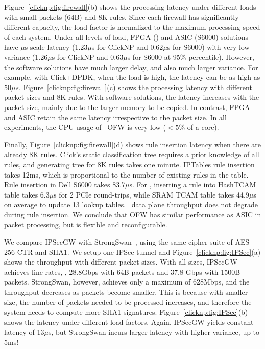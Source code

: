 Figure~\ref{clicknp:fig:firewall}(b) shows the processing latency under different loads with small packets (64B) and 8K rules. 
Since each firewall has significantly different capacity, the load factor is normalized to the maximum processing speed of each system. 
%
Under all levels of load, FPGA (\name) and ASIC (S6000) solutions have $\mu$s-scale latency (1.23$\mu$s for ClickNP and 0.62$\mu$s for S6000) with very low variance (1.26$\mu$s for ClickNP and 0.63$\mu$s for S6000 at 95\% percentile).
However, the software solutions have much larger delay, and also much larger variance. 
For example, with Click+DPDK, when the load is high, the latency can be as high as $50\mu s$.
%
Figure~\ref{clicknp:fig:firewall}(c) shows the processing latency with different packet sizes and 8K rules.
With software solutions, the latency increases with the packet size, mainly due to the larger 
memory to be copied.
In contrast, FPGA and ASIC retain the same latency irrespective to the packet size. 
In all experiments, the CPU usage of \name\ OFW is very low ($<5\%$ of a core).

Finally, Figure~\ref{clicknp:fig:firewall}(d) shows rule insertion latency when there are already 8K rules. Click's static classification tree requires a prior knowledge of all rules, and generating tree for 8K rules takes one minute.
IPTables rule insertion takes 12ms, which is proportional to the number of existing rules in the table.
Rule insertion in Dell S6000 takes 83.7$\mu$s.
For \name, inserting a rule into HashTCAM table takes 6.3$\mu$s for 2 PCIe round-trips, while SRAM TCAM table takes 44.9$\mu$s on average to update 13 lookup tables.
\name\ data plane throughput does not degrade during rule insertion.
We conclude that OFW has similar performance as ASIC in packet processing, but is flexible and reconfigurable.



 We compare IPSecGW with StrongSwan~\cite{strongswan}, using the same cipher suite of
AES-256-CTR and SHA1. We setup one IPSec tunnel and Figure~\ref{clicknp:fig:IPSec}(a) shows the throughput with different packet sizes.
With all sizes, IPSecGW achieves line rates, \ie, 28.8Gbps with 64B packets and 37.8 Gbps with 1500B packets. 
%
StrongSwan, however, achieves only a maximum of 628Mbps, and the throughput decreases as packets become smaller.
This is because with smaller size, the number of packets needed to be processed increases, 
and therefore the system needs to compute more SHA1 signatures.
%
Figure~\ref{clicknp:fig:IPSec}(b) shows the latency under different load factors. Again, IPSecGW yields constant latency of 13$\mu$s, 
but StrongSwan incurs larger latency with higher variance, up to 5ms!

